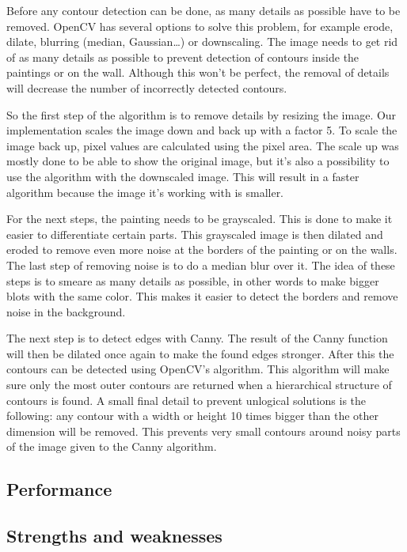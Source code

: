 Before any contour detection can be done, as many details as possible have to be removed. OpenCV has several options to solve this problem, for example erode, dilate, blurring (median, Gaussian\dots) or downscaling. The image needs to get rid of as many details as possible to prevent detection of contours inside the paintings or on the wall. Although this won't be perfect, the removal of details will decrease the number of incorrectly detected contours.

So the first step of the algorithm is to remove details by resizing the image. Our implementation scales the image down and back up with a factor 5. To scale the image back up, pixel values are calculated using the pixel area. The scale up was mostly done to be able to show the original image, but it's also a possibility to use the algorithm with the downscaled image. This will result in a faster algorithm because the image it's working with is smaller.

For the next steps, the painting needs to be grayscaled. This is done to make it easier to differentiate certain parts. This grayscaled image is then dilated and eroded to remove even more noise at the borders of the painting or on the walls. The last step of removing noise is to do a median blur over it. The idea of these steps is to smeare as many details as possible, in other words to make bigger blots with the same color. This makes it easier to detect the borders and remove noise in the background.

The next step is to detect edges with Canny. The result of the Canny function will then be dilated once again to make the found edges stronger. After this the contours can be detected using OpenCV's algorithm. This algorithm will make sure only the most outer contours are returned when a hierarchical structure of contours is found. A small final detail to prevent unlogical solutions is the following: any contour with a width or height 10 times bigger than the other dimension will be removed. This prevents very small contours around noisy parts of the image given to the Canny algorithm.

\subsection{Performance}


\subsection{Strengths and weaknesses}


